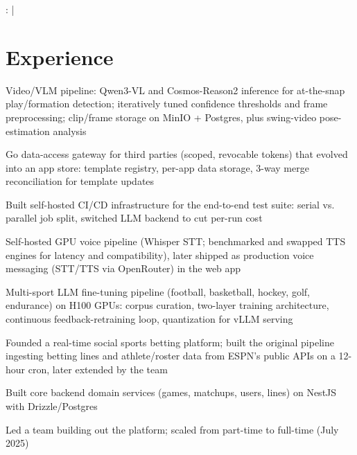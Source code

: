 \documentclass[]{jack-resume}
\begin{document}
\raggedright{
    :
      \href{https://www.linkedin.com/in/jack-sturtevant/}{ \ExternalLink} |
     \href{https://github.com/jacksturt}{ \ExternalLink}}


\section{Experience}

\begin{tightemize}
    \item Video/VLM pipeline: Qwen3-VL and Cosmos-Reason2 inference for at-the-snap play/formation detection; iteratively tuned confidence thresholds and frame preprocessing; clip/frame storage on MinIO + Postgres, plus swing-video pose-estimation analysis
    \item Go data-access gateway for third parties (scoped, revocable tokens) that evolved into an app store: template registry, per-app data storage, 3-way merge reconciliation for template updates
    \item Built self-hosted CI/CD infrastructure for the end-to-end test suite: serial vs. parallel job split, switched LLM backend to cut per-run cost
    \item Self-hosted GPU voice pipeline (Whisper STT; benchmarked and swapped TTS engines for latency and compatibility), later shipped as production voice messaging (STT/TTS via OpenRouter) in the web app
    \item Multi-sport LLM fine-tuning pipeline (football, basketball, hockey, golf, endurance) on H100 GPUs: corpus curation, two-layer training architecture, continuous feedback-retraining loop, quantization for vLLM serving
\end{tightemize}
\sectionsep

\begin{tightemize}
    \item Founded a real-time social sports betting platform; built the original pipeline ingesting betting lines and athlete/roster data from ESPN's public APIs on a 12-hour cron, later extended by the team
    \item Built core backend domain services (games, matchups, users, lines) on NestJS with Drizzle/Postgres
    \item Led a team building out the platform; scaled from part-time to full-time (July 2025)
\end{tightemize}
\sectionsep
\end{document}
